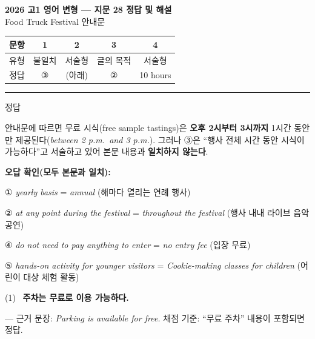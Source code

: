 \documentclass[11pt,a4paper]{article}
\newcommand{\sol}[2]{\vspace{6pt}{\sffamily\bfseries #1} \quad 정답 \fbox{#2}\par\vspace{1pt}}
\begin{document}
\begin{center}
{\fontsize{15}{17}\selectfont\sffamily\bfseries 2026 고1 영어 변형 — 지문 28 정답 및 해설}\\[2pt]
{\sffamily Food Truck Festival 안내문}
\end{center}
\vspace{6pt}

\begin{center}
\renewcommand{\arraystretch}{1.4}
\begin{tabular}{|c|c|c|c|c|}
\hline
\sffamily 문항 & 1 & 2 & 3 & 4 \\\hline
\sffamily 유형 & \sffamily 불일치 & \sffamily 서술형 & \sffamily 글의 목적 & \sffamily 서술형 \\\hline
\sffamily 정답 & ③ & (아래) & ② & 10 hours \\\hline
\end{tabular}
\end{center}
\vspace{8pt}\hrule\vspace{4pt}

\sol{1. 내용 불일치}{③}
안내문에 따르면 무료 시식(free sample tastings)은 \textbf{오후 2시부터 3시까지} 1시간 동안만 제공된다(\textit{between 2 p.m.\ and 3 p.m.}). 그러나 ③은 ``행사 전체 시간 동안 시식이 가능하다''고 서술하고 있어 본문 내용과 \textbf{일치하지 않는다}.\par
\vspace{2pt}
\textbf{오답 확인(모두 본문과 일치):}\par
\hspace{1em}① \textit{yearly basis} = \textit{annual} (해마다 열리는 연례 행사)\par
\hspace{1em}② \textit{at any point during the festival} = \textit{throughout the festival} (행사 내내 라이브 음악 공연)\par
\hspace{1em}④ \textit{do not need to pay anything to enter} = \textit{no entry fee} (입장 무료)\par
\hspace{1em}⑤ \textit{hands-on activity for younger visitors} = \textit{Cookie-making classes for children} (어린이 대상 체험 활동)

\vspace{8pt}{\sffamily\bfseries 2. 서술형}\par\vspace{4pt}

(1)  \ \textbf{주차는 무료로 이용 가능하다.}\par
\vspace{1pt}\hspace{1.5em}— 근거 문장: \textit{Parking is available for free.} \quad 채점 기준: ``무료 주차'' 내용이 포함되면 정답.
\end{document}
